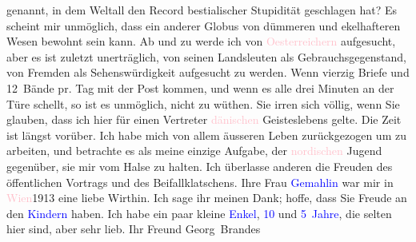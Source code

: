                    genannt, in dem Weltall den Record bestialischer Stupidität geschlagen hat? Es
                    scheint mir unmöglich, dass ein anderer Globus von dümmeren und ekelhafteren
                    Wesen bewohnt sein kann.\pend
           \pstart
           Ab und zu werde ich von \textcolor{pink}{Oesterreichern}{}\ledrightnote{\textcolor{pink}{Österreich}}
                    aufgesucht, aber es ist zuletzt unerträglich, von seinen Landsleuten als
                    Gebrauchsgegenstand, {\pb}von
                    Fremden als Sehenswürdigkeit aufgesucht zu werden. Wenn vierzig Briefe und
                    12 Bände pr. Tag  mit der Post \introOben{}kommen,\introOben{} und wenn es alle drei Minuten an der Türe
                    schellt, so ist es unmöglich, nicht zu wüthen.\pend
           \pstart
           Sie irren sich völlig, wenn Sie glauben, dass ich hier für einen Vertreter \textcolor{pink}{dänischen}{}\ledrightnote{\textcolor{pink}{Dänemark}} Geisteslebens gelte. Die Zeit ist
                    längst vorüber. Ich habe mich von allem äusseren Leben zurückgezogen um zu
                    arbeiten, und betrachte es als meine einzige Aufgabe, der \textcolor{pink}{nordischen}{}\ledrightnote{\textcolor{pink}{Skandinavien}} Jugend gegenüber, sie mir vom Halse zu halten.
                    Ich überlasse anderen die Freuden des öffentlichen Vortrags und des
                    Beifallklatschens.\pend
           \pstart
           Ihre Frau \textcolor{blue}{Gemahlin}{} war mir
                    in \textcolor{pink}{Wien}{}\ledrightnote{\textcolor{pink}{Wien}}{ }1913 eine liebe Wirthin. Ich sage ihr meinen Dank; hoffe, dass Sie
                    Freude an den \textcolor{blue}{Kindern}{} haben. Ich habe ein paar kleine \textcolor{blue}{Enkel}{}, \textcolor{blue}{10}{} und \textcolor{blue}{5 Jahre}{}, die selten hier sind, aber sehr lieb.\pend
           \pstart Ihr Freund \spacefill\mbox{Georg Brandes}\pend{}\endnumbering{}  
      